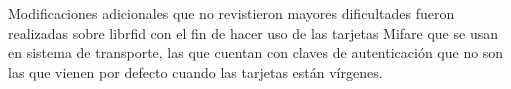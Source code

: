 Modificaciones adicionales que no revistieron mayores dificultades fueron realizadas sobre librfid con el fin de hacer uso de las tarjetas Mifare que se usan en sistema de transporte, las que cuentan con claves de autenticación que no son las que vienen por defecto cuando las tarjetas están vírgenes. 